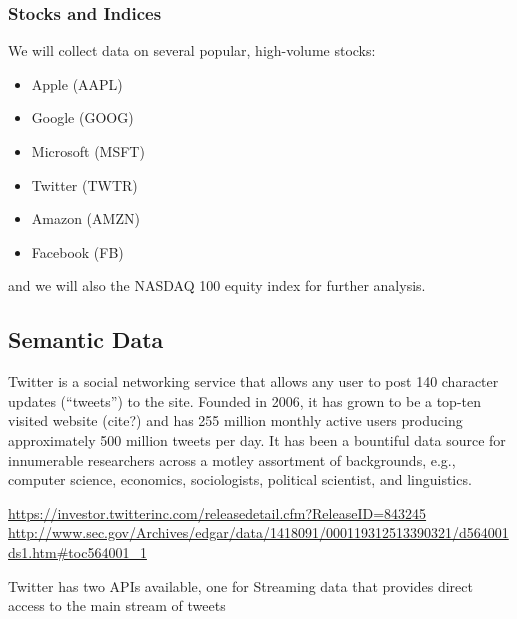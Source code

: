 \documentclass[titlepage]{article}\usepackage[]{graphicx}\usepackage[]{color}
\begin{document}
\subsubsection{Stocks and Indices}
We will collect data on several popular, high-volume stocks:

\begin{itemize}
	\item Apple (AAPL)
	\item Google (GOOG)
	\item Microsoft (MSFT)
	\item Twitter (TWTR)
	\item Amazon (AMZN)
	\item Facebook (FB)
\end{itemize}

and we will also the NASDAQ 100 equity index for further analysis.


\subsection{Semantic Data}
Twitter is a social networking service that allows any user to post 140
character updates (``tweets'') to the site. Founded in 2006, it has grown to be
a top-ten visited website (cite?) and has 255 million monthly active users
producing approximately 500 million tweets per day. It has been a bountiful
data source for innumerable researchers across a motley assortment of
backgrounds, e.g., computer science, economics, sociologists, political
scientist, and linguistics.

\url{https://investor.twitterinc.com/releasedetail.cfm?ReleaseID=843245}
\url{http://www.sec.gov/Archives/edgar/data/1418091/000119312513390321/d564001ds1.htm#toc564001_1}

Twitter has two APIs available, one for Streaming data that provides direct access to the main stream of tweets
\end{document}
